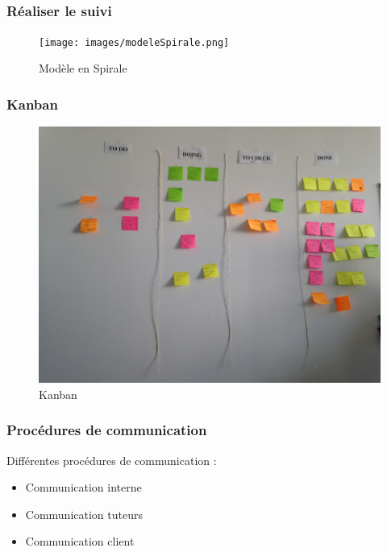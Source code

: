 \subsection{}

\begin{frame}
\frametitle{Réaliser le suivi}
\begin{figure}
\begin{center}
\texttt{[image: images/modeleSpirale.png]}
\caption{Modèle en Spirale}
\label{MS}
\end{center}
\end{figure}
\end{frame}

\begin{frame}
\frametitle{Kanban}
\begin{figure}
\includegraphics[scale=0.075]{images/kanban.JPG}
\caption{Kanban}
\label{Kn}
\end{figure}
\end{frame}

\begin{frame}
\frametitle{Procédures de communication}
Différentes procédures de communication :
\begin{itemize}
\item Communication interne
\item Communication tuteurs
\item Communication client
\end{itemize}
\end{frame}

